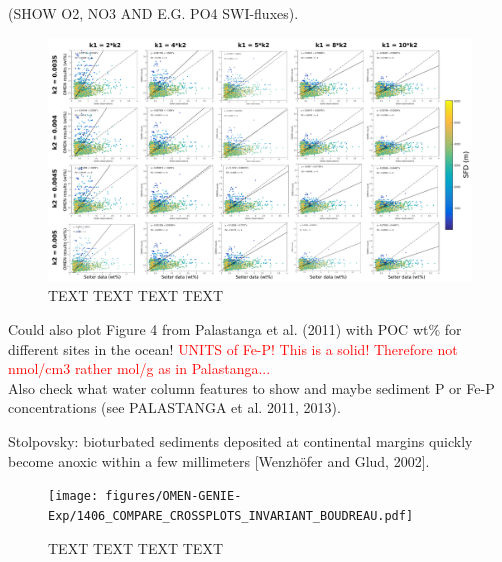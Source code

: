 \documentclass[gmd, manuscript]{copernicus}
\begin{document}
(SHOW O2, NO3 AND E.G. PO4 SWI-fluxes).

\begin{figure}[htbp]
\begin{center}
	\includegraphics[width=1.0\textwidth]{figures/OMEN-GENIE-Exp/1406_invariant_k_5cmNORMAL_CROSSPLOT_WITH_REGRESSION_notitle.pdf}
	\caption{TEXT TEXT TEXT TEXT}\label{fig:OMEN_GENIE_invariant_results}
\end{center}
\end{figure}


Could also plot Figure 4 from Palastanga et al. (2011) with POC wt\% for different sites in the ocean!
\textcolor{red}{UNITS of Fe-P! This is a solid! Therefore not nmol/cm3 rather mol/g as in Palastanga... }\\

Also check what water column features to show and maybe sediment P or Fe-P concentrations (see PALASTANGA et al. 2011, 2013).

Stolpovsky: bioturbated sediments deposited at continental margins quickly become anoxic within a few millimeters [Wenzhöfer and Glud, 2002].

\begin{figure}[htbp]
\begin{center}
	\texttt{[image: figures/OMEN-GENIE-Exp/1406\_COMPARE\_CROSSPLOTS\_INVARIANT\_BOUDREAU.pdf]}
	\caption{TEXT TEXT TEXT TEXT}\label{fig:OMEN_GENIE_invariant_and_Boudreau}
\end{center}
\end{figure}

\end{document}
